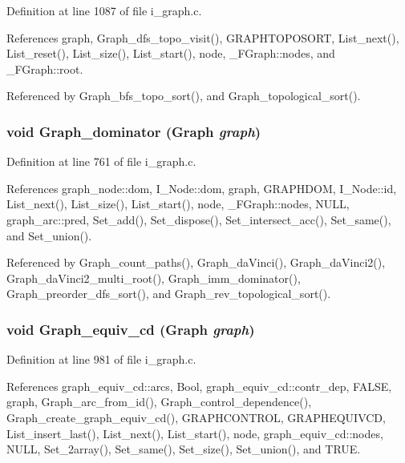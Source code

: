 Definition at line 1087 of file i\_\-graph.c.

References graph, Graph\_\-dfs\_\-topo\_\-visit(), GRAPHTOPOSORT, List\_\-next(), List\_\-reset(), List\_\-size(), List\_\-start(), node, \_\-FGraph::nodes, and \_\-FGraph::root.

Referenced by Graph\_\-bfs\_\-topo\_\-sort(), and Graph\_\-topological\_\-sort().
\subsubsection{\setlength{\rightskip}{0pt plus 5cm}void Graph\_\-dominator (\bf{Graph} {\em graph})}\label{i__graph_8h_85f44f6412a01ba0b41de6e8ef6d1773}




Definition at line 761 of file i\_\-graph.c.

References graph\_\-node::dom, I\_\-Node::dom, graph, GRAPHDOM, I\_\-Node::id, List\_\-next(), List\_\-size(), List\_\-start(), node, \_\-FGraph::nodes, NULL, graph\_\-arc::pred, Set\_\-add(), Set\_\-dispose(), Set\_\-intersect\_\-acc(), Set\_\-same(), and Set\_\-union().

Referenced by Graph\_\-count\_\-paths(), Graph\_\-da\-Vinci(), Graph\_\-da\-Vinci2(), Graph\_\-da\-Vinci2\_\-multi\_\-root(), Graph\_\-imm\_\-dominator(), Graph\_\-preorder\_\-dfs\_\-sort(), and Graph\_\-rev\_\-topological\_\-sort().
\subsubsection{\setlength{\rightskip}{0pt plus 5cm}void Graph\_\-equiv\_\-cd (\bf{Graph} {\em graph})}\label{i__graph_8h_c40cd2fea6900c05dc6b2177d1a834a3}




Definition at line 981 of file i\_\-graph.c.

References graph\_\-equiv\_\-cd::arcs, Bool, graph\_\-equiv\_\-cd::contr\_\-dep, FALSE, graph, Graph\_\-arc\_\-from\_\-id(), Graph\_\-control\_\-dependence(), Graph\_\-create\_\-graph\_\-equiv\_\-cd(), GRAPHCONTROL, GRAPHEQUIVCD, List\_\-insert\_\-last(), List\_\-next(), List\_\-start(), node, graph\_\-equiv\_\-cd::nodes, NULL, Set\_\-2array(), Set\_\-same(), Set\_\-size(), Set\_\-union(), and TRUE.
